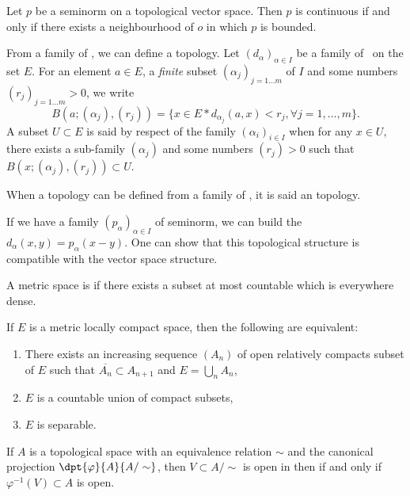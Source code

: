 \begin{proposition}
Let $p$ be a seminorm on a topological vector space. Then $p$ is continuous if and only if there exists a neighbourhood of $o$ in which $p$ is bounded.
\label{prop:semi_norm_cont}
\end{proposition}


From a family of \ecarts, we can define a topology. Let $(d_{\alpha})_{\alpha\in I}$ be a family of \ecarts\ on the set $E$. For an element $a\in E$, a \emph{finite} subset $(\alpha_j)_{j=1\ldots m}$ of $I$ and some numbers $(r_j)_{j=1\ldots m}>0$, we write
\[
  B(a; (\alpha_j),(r_j))=\{x\in E\ast d_{\alpha_j}(a,x)<r_j,\forall j=1,\ldots,m\}.
\]
\label{topo_semi_norm} A subset $U\subset E$ is said  by respect of the family $(\alpha_i)_{i\in I}$ when for any $x\in U$, there exists a sub-family $(\alpha_j)$ and some numbers $(r_j)>0$ such that $B(x;(\alpha_j),(r_j))\subset U$.

\begin{definition}
When a topology can be defined from a family of \ecarts, it is said an  topology.
\end{definition}

If we have a family $(p_{\alpha})_{\alpha\in I}$ of seminorm, we can build the \ecarts\ $d_{\alpha}(x,y)=p_{\alpha}(x-y)$. One can show that this topological structure is compatible with the vector space structure.


\begin{definition}
A metric space is  if there exists a subset at most countable which is everywhere dense.
\end{definition}

\begin{proposition}
If $E$ is a metric locally compact space, then the following are equivalent:
\begin{enumerate}
\item There exists an increasing sequence $(A_n)$ of open relatively compacts subset of $E$ such that $\overline{A_n}\subset A_{n+1}$ and $E=\bigcup_n A_n$,

\item $E$ is a countable union of compact subsets,

\item $E$ is separable.
\end{enumerate}
\end{proposition}

If $A$ is a topological space with an equivalence relation $\sim$ and the canonical projection $\dpt{\varphi}{A}{A/\sim}$, then $V\subset A/\sim$ is open in then  if and only if $\varphi^{-1}(V)\subset A$ is open.

